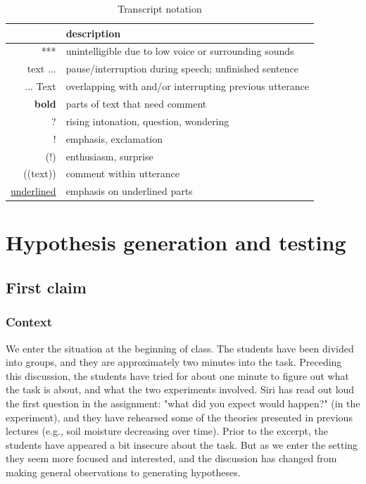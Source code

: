 \begin{table}[H]
	\begin{center}
		\begin{tabular}{r l} \toprule
			 &  description \\ \midrule 
			 *** & unintelligible due to low voice or surrounding sounds \\
			 text ... & pause/interruption during speech; unfinished sentence \\
			 ... Text & overlapping with and/or interrupting previous utterance \\
			 \textbf{bold} & parts of text that need comment \\
			 ? & rising intonation, question, wondering \\
			 ! & emphasis, exclamation \\
			 (!) & enthusiasm, surprise \\
			 ((text)) & comment within utterance \\
			 \underline{underlined} & emphasis on underlined parts \\
			 \bottomrule

\end{tabular}
\end{center}
\caption{Transcript notation}
\end{table}


\section{Hypothesis generation and testing}
\label{cha:hypothesisgeneration}
\subsection{First claim}
\subsubsection*{Context}
\label{firsthypothesis}
We enter the situation at the beginning of class. The students have been divided into groups, and they are approximately two minutes into the task. Preceding this discussion, the students have tried for about one minute to figure out what the task is about, and what the two experiments involved. Siri has read out loud the first question in the assignment: "what did you expect would happen?" (in the experiment), and they have rehearsed some of the theories presented in previous lectures (e.g., soil moisture decreasing over time). Prior to the excerpt, the students have appeared a bit insecure about the task. But as we enter the setting they seem more focused and interested, and the discussion has changed from making general observations to generating hypotheses.

